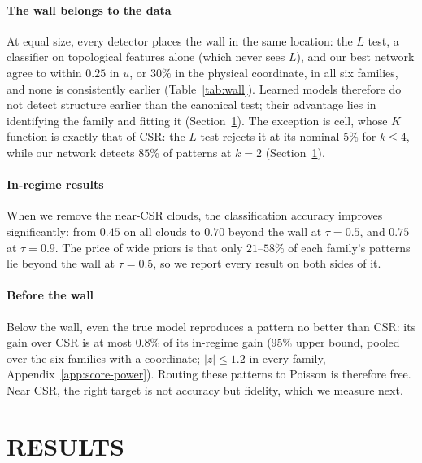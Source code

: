 \documentclass[twoside]{article}
\begin{document}
\paragraph{The wall belongs to the data} At equal size, every detector places the wall in the same location: the $L$
test, a classifier on topological features alone (which never sees $L$), and our best network agree to within $0.25$
in $u$, or $30\%$ in the physical coordinate, in all six families, and none is consistently earlier
(Table~\ref{tab:wall}). Learned models therefore do not detect structure
earlier than the canonical test; their advantage lies in identifying the family and fitting it
(Section~\ref{sec:fidelity}). The exception is cell, whose $K$ function is exactly that of CSR: the $L$ test rejects it
at its nominal $5\%$ for $k\le4$, while our network detects $85\%$ of patterns at $k=2$ (Section~\ref{sec:fidelity}).

\paragraph{In-regime results} When we remove the near-CSR clouds, the classification accuracy improves significantly:
from $0.45$ on all clouds to $0.70$ beyond the wall at $\tau=0.5$, and $0.75$ at $\tau=0.9$. The price of wide priors is
that only $21$--$58\%$ of each family's patterns lie beyond the wall at $\tau=0.5$, so we report every result on both
sides of it.

\paragraph{Before the wall} Below the wall, even the true model reproduces a pattern no better than CSR: its gain over
CSR is at most $0.8\%$ of its in-regime gain (95\% upper bound, pooled over the six families with a coordinate;
$|z|\le1.2$ in every family, Appendix~\ref{app:score-power}). Routing these patterns
to Poisson is therefore free. Near CSR, the right target is not accuracy but fidelity, which we measure next.




\section{RESULTS}
\label{sec:fidelity}

\end{document}

